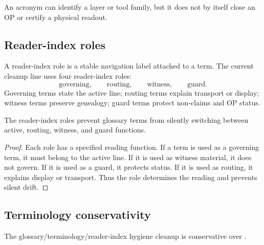\begin{remark}
\label{rem:v409-acronyms-do-not-carry-closure}
An acronym can identify a layer or tool family, but it does not by itself close
an OP or certify a physical readout.
\end{remark}

\subsection{Reader-index roles}
\label{subsec:v409-reader-index-roles}

\begin{definition}
\label{def:v409-reader-index-role}
A reader-index role is a stable navigation label attached to a term. The
current cleanup line uses four reader-index roles:
\[
 \text{governing},\qquad
 \text{routing},\qquad
 \text{witness},\qquad
 \text{guard}.
\]
Governing terms state the active line; routing terms explain transport or
display; witness terms preserve genealogy; guard terms protect non-claims and
OP status.
\end{definition}

\begin{lemma}
\label{lem:v409-reader-index-roles-prevent-role-drift}
The reader-index roles prevent glossary terms from silently switching between
active, routing, witness, and guard functions.
\end{lemma}

\begin{proof}
Each role has a specified reading function. If a term is used as a governing
term, it must belong to the active line. If it is used as witness material, it
does not govern. If it is used as a guard, it protects status. If it is used
as routing, it explains display or transport. Thus the role determines the
reading and prevents silent drift.
\end{proof}

\subsection{Terminology conservativity}
\label{subsec:v409-terminology-conservativity}

\begin{theorem}
\label{thm:v409-glossary-terminology-hygiene-conservativity}
The  glossary/terminology/reader-index hygiene cleanup is conservative
over .
\end{theorem}

